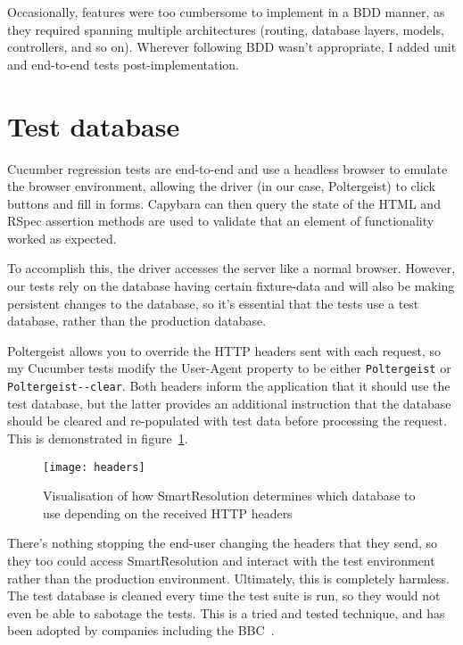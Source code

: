 Occasionally, features were too cumbersome to implement in a BDD manner, as they required spanning multiple architectures (routing, database layers, models, controllers, and so on). Wherever following BDD wasn't appropriate, I added unit and end-to-end tests post-implementation.

\section{Test database}

Cucumber regression tests are end-to-end and use a headless browser to emulate the browser environment, allowing the driver (in our case, Poltergeist) to click buttons and fill in forms. Capybara can then query the state of the HTML and RSpec assertion methods are used to validate that an element of functionality worked as expected.

To accomplish this, the driver accesses the server like a normal browser. However, our tests rely on the database having certain fixture-data and will also be making persistent changes to the database, so it's essential that the tests use a test database, rather than the production database.

Poltergeist allows you to override the HTTP headers sent with each request, so my Cucumber tests modify the User-Agent property to be either \lstinline{Poltergeist} or \lstinline{Poltergeist--clear}. Both headers inform the application that it should use the test database, but the latter provides an additional instruction that the database should be cleared and re-populated with test data before processing the request. This is demonstrated in figure~\ref{uml:headers}.

\begin{figure}[h!]
  \centering
    \ifimages
    \texttt{[image: headers]}
    \fi
  \caption{Visualisation of how SmartResolution determines which database to use depending on the received HTTP headers}
  \label{uml:headers}
\end{figure}

There's nothing stopping the end-user changing the headers that they send, so they too could access SmartResolution and interact with the test environment rather than the production environment. Ultimately, this is completely harmless. The test database is cleaned every time the test suite is run, so they would not even be able to sabotage the tests. This is a tried and tested technique, and has been adopted by companies including the BBC~\cite{bbc:cucumber}.

